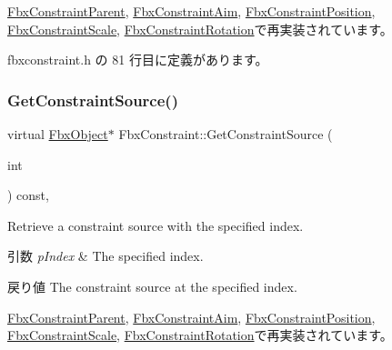 \hyperlink{class_fbx_constraint_parent_a8c878a029a5628f328244f824d3f8847}{Fbx\+Constraint\+Parent}, \hyperlink{class_fbx_constraint_aim_a7245132b757540df762f9b37dae533cf}{Fbx\+Constraint\+Aim}, \hyperlink{class_fbx_constraint_position_a2722540075ef79aa2d14e7e838afaf79}{Fbx\+Constraint\+Position}, \hyperlink{class_fbx_constraint_scale_a1dcbdc6b41d04d6a75ca47f024e05dc9}{Fbx\+Constraint\+Scale}, \hyperlink{class_fbx_constraint_rotation_ad9bdaf083716c730fdd907a9387e4991}{Fbx\+Constraint\+Rotation}で再実装されています。



 fbxconstraint.\+h の 81 行目に定義があります。

\mbox{\label{class_fbx_constraint_a5ff6fe6fc98af1e33e8b297bc1cea007}} 
\subsubsection{\texorpdfstring{Get\+Constraint\+Source()}{GetConstraintSource()}}
{\footnotesize\ttfamily virtual \hyperlink{class_fbx_object}{Fbx\+Object}$\ast$ Fbx\+Constraint\+::\+Get\+Constraint\+Source (\begin{DoxyParamCaption}\item[{int}]{ }\end{DoxyParamCaption}) const\hspace{0.3cm}{\ttfamily [inline]}, {\ttfamily [virtual]}}

Retrieve a constraint source with the specified index. 
\begin{DoxyParams}{引数}
{\em p\+Index} & The specified index. \\
\hline
\end{DoxyParams}
\begin{DoxyReturn}{戻り値}
The constraint source at the specified index. 
\end{DoxyReturn}


\hyperlink{class_fbx_constraint_parent_a687e5a56dfd3882d4ff0c3454a976051}{Fbx\+Constraint\+Parent}, \hyperlink{class_fbx_constraint_aim_ae5d3634ababc5cb0af0734b41c78218a}{Fbx\+Constraint\+Aim}, \hyperlink{class_fbx_constraint_position_a0024d10c8464eba13d5f3c3037e973cf}{Fbx\+Constraint\+Position}, \hyperlink{class_fbx_constraint_scale_ac957fc33cab352ef355602fb4325c5b7}{Fbx\+Constraint\+Scale}, \hyperlink{class_fbx_constraint_rotation_a4bfb008520cb5aa6996104c292e5819e}{Fbx\+Constraint\+Rotation}で再実装されています。



